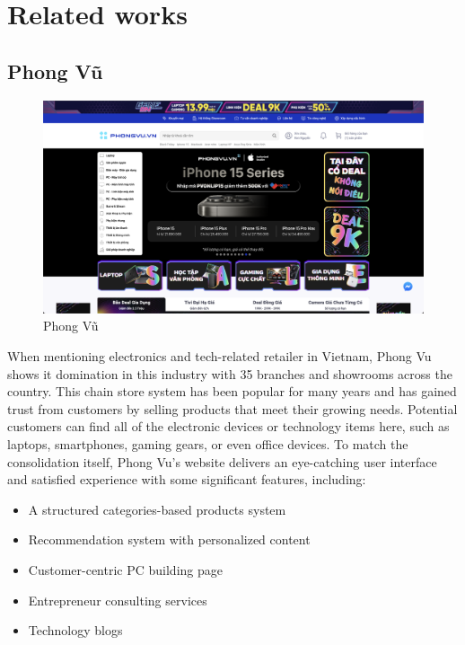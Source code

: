 \section{Related works}


\subsection{Phong Vũ}
\begin{figure}[H]
    \centering
    \includegraphics[width=1\linewidth]{image/related-works/phongvu.png}
    \caption{Phong Vũ}
    \label{fig:phong_vu}
\end{figure}

\noindent When mentioning electronics and tech-related retailer in Vietnam, Phong Vu shows it domination in this industry with 35 branches and showrooms across the country. This chain store system has been popular for many years and has gained trust from customers by selling products that meet their growing needs. Potential customers can find all of the electronic devices or technology items here, such as laptops, smartphones, gaming gears, or even office devices. To match the consolidation itself, Phong Vu's website delivers an eye-catching user interface and satisfied experience with some significant features, including:
\begin{itemize}
    \item A structured categories-based products system
    \item Recommendation system with personalized content
    \item Customer-centric PC building page
    \item Entrepreneur consulting services
    \item Technology blogs
\end{itemize}

